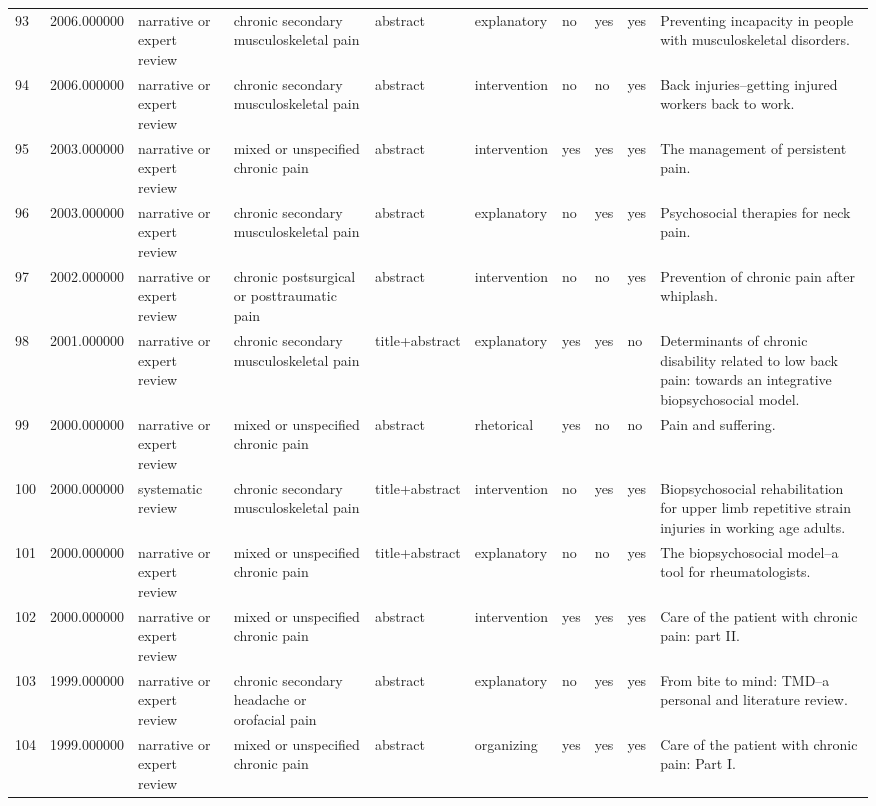 \begin{longtable}{p{0.7cm}p{0.7cm}p{1.2cm}p{1.9cm}p{1.3cm}p{1.5cm}p{0.55cm}p{0.55cm}p{0.55cm}p{3.2cm}}
93 & 2006.000000 & narrative or expert review & chronic secondary musculoskeletal pain & abstract & explanatory & no & yes & yes & Preventing incapacity in people with musculoskeletal disorders. \\
94 & 2006.000000 & narrative or expert review & chronic secondary musculoskeletal pain & abstract & intervention & no & no & yes & Back injuries--getting injured workers back to work. \\
95 & 2003.000000 & narrative or expert review & mixed or unspecified chronic pain & abstract & intervention & yes & yes & yes & The management of persistent pain. \\
96 & 2003.000000 & narrative or expert review & chronic secondary musculoskeletal pain & abstract & explanatory & no & yes & yes & Psychosocial therapies for neck pain. \\
97 & 2002.000000 & narrative or expert review & chronic postsurgical or posttraumatic pain & abstract & intervention & no & no & yes & Prevention of chronic pain after whiplash. \\
98 & 2001.000000 & narrative or expert review & chronic secondary musculoskeletal pain & title+abstract & explanatory & yes & yes & no & Determinants of chronic disability related to low back pain: towards an integrative biopsychosocial model. \\
99 & 2000.000000 & narrative or expert review & mixed or unspecified chronic pain & abstract & rhetorical & yes & no & no & Pain and suffering. \\
100 & 2000.000000 & systematic review & chronic secondary musculoskeletal pain & title+abstract & intervention & no & yes & yes & Biopsychosocial rehabilitation for upper limb repetitive strain injuries in working age adults. \\
101 & 2000.000000 & narrative or expert review & mixed or unspecified chronic pain & title+abstract & explanatory & no & no & yes & The biopsychosocial model--a tool for rheumatologists. \\
102 & 2000.000000 & narrative or expert review & mixed or unspecified chronic pain & abstract & intervention & yes & yes & yes & Care of the patient with chronic pain: part II. \\
103 & 1999.000000 & narrative or expert review & chronic secondary headache or orofacial pain & abstract & explanatory & no & yes & yes & From bite to mind: TMD--a personal and literature review. \\
104 & 1999.000000 & narrative or expert review & mixed or unspecified chronic pain & abstract & organizing & yes & yes & yes & Care of the patient with chronic pain: Part I. \\

\end{longtable}
